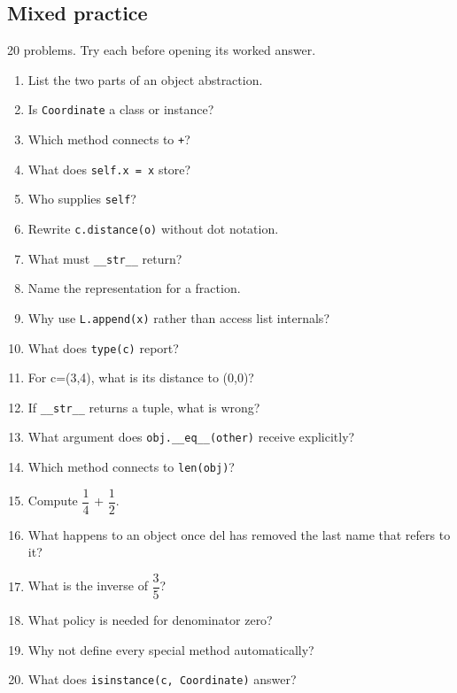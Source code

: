 \documentclass[11pt]{article}
\begin{document}
\begin{keepsection}
\section{Mixed practice}

20 problems. Try each before opening its worked answer.

\begin{enumerate}
\item List the two parts of an object abstraction.
\item Is \texttt{Coordinate} a class or instance?
\item Which method connects to \texttt{+}?
\item What does \texttt{self.x = x} store?
\item Who supplies \texttt{self}?
\item Rewrite \texttt{c.distance(o)} without dot notation.
\item What must \texttt{\_\_str\_\_} return?
\item Name the representation for a fraction.
\item Why use \texttt{L.append(x)} rather than access list internals?
\item What does \texttt{type(c)} report?
\item For c=(3,4), what is its distance to (0,0)?
\item If \texttt{\_\_str\_\_} returns a tuple, what is wrong?
\item What argument does \texttt{obj.\_\_eq\_\_(other)} receive explicitly?
\item Which method connects to \texttt{len(obj)}?
\item Compute {\small\ensuremath{\dfrac{1}{4}}} + {\small\ensuremath{\dfrac{1}{2}}}.
\item What happens to an object once del has removed the last name that refers to it?
\item What is the inverse of {\small\ensuremath{\dfrac{3}{5}}}?
\item What policy is needed for denominator zero?
\item Why not define every special method automatically?
\item What does \texttt{isinstance(c, Coordinate)} answer?
\end{enumerate}

\end{keepsection}
\end{document}
